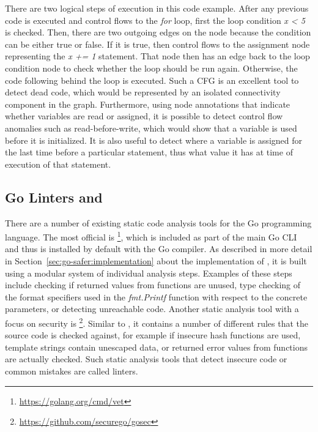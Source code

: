 

There are two logical steps of execution in this code example.
After any previous code is executed and control flows to the \textit{for} loop, first the loop condition \textit{x < 5}
is checked.
Then, there are two outgoing edges on the node because the condition can be either true or false.
If it is true, then control flows to the assignment node representing the \textit{x += 1} statement.
That node then has an edge back to the loop condition node to check whether the loop should be run again.
Otherwise, the code following behind the loop is executed.
Such a \acrshort{CFG} is an excellent tool to detect dead code, which would be represented by an isolated connectivity
component in the graph.
Furthermore, using node annotations that indicate whether variables are read or assigned, it is possible to detect
control flow anomalies such as read-before-write, which would show that a variable is used before it is initialized.
It is also useful to detect where a variable is assigned for the last time before a particular statement, thus what
value it has at time of execution of that statement.



\subsection{Go Linters \toolVet{} and \toolGosec{}}\label{subsec:background:static-code-analysis:linters}

There are a number of existing static code analysis tools for the Go programming language.
The most official is \toolVet{}\footnote{\url{https://golang.org/cmd/vet}}, which is included as part of the main Go
\acrshort{CLI} and thus is installed by default with the Go compiler.
As described in more detail in Section~\ref{sec:go-safer:implementation} about the implementation of \toolSafer{}, it
is built using a modular system of individual analysis steps.
Examples of these steps include checking if returned values from functions are unused, type checking of the format
specifiers used in the \textit{fmt.Printf} function with respect to the concrete parameters, or detecting unreachable
code.
Another static analysis tool with a focus on security is \toolGosec{}\footnote{\url{https://github.com/securego/gosec}}.
Similar to \toolVet{}, it contains a number of different rules that the source code is checked against, for example if
insecure hash functions are used, template strings contain unescaped data, or returned error values from functions are
actually checked.
Such static analysis tools that detect insecure code or common mistakes are called linters.

